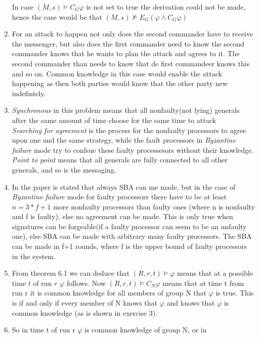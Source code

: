 \documentclass[12pt]{article} %
\begin{document}
\begin{enumerate}
        In case $(M,s) \models C_G\varphi$ is not set to true the derivation
        could not be made, hence the case would be that $(M,s) \nvDash
        E_G(\varphi \wedge C_G\varphi)$
    \item
        For an attack to happen not only does the second commander have to receive the
        messenger, but also does the first commander need to know the second
        commander knows that he wants to plan the attack and agrees to it. The
        second commander than needs to know that de first commandeer knows this
        and so on. Common knowledge in this case would enable the attack
        happening as then both parties would know that the other party new
        indefintely.
    \item \emph{Synchronous} in this problem means that all nonfaulty(not
        lying) generals after the same amount of time choose for the same time
        to attack\\
        \emph{Searching for agreement} is the process for the nonfaulty
        processors to agree upon one and the same strategy, while the fault
        processors in \emph{Byzantine failure} mode try to confsue these faulty
        processesors without their knowledge.\\
        \emph{Point to point} means that all generals are fully connected to all
        other generals, and so is the messaging.
    \item In the paper is stated that always SBA can me made, but in the case of \emph{Byzantine failure}
        mode for faulty processors there have to be at least $n = 3*f + 1$ more
        nonfaulty processors than faulty ones (where n is nonfaulty and f is
        faulty), else no agreement can be made. This is only true when
        signatures can be forgeable(if a faulty processor can seem to be an
        unfaulty one), else SBA can be made with arbitrary many
        faulty processors. The SBA can be made in f+1 rounds, where f is the
        upper bound of faulty processors in the system.
    \item From theorem 6.1 we can deduce that $(R, r, t) \models \varphi$ means
        that at a possible time $t$ of run $r$ $\varphi$ follows. Now
         $(R, r, t) \models  C_N\varphi$ means that at time t from run r it is
         common knowledge for all members of group N that $\varphi$ is true.
         This is if and only if every member of N knows that $\varphi$ and knows
         that $\varphi$ is common knowledge (as is shown in exercise 3).
    \item So in time t of run r $\varphi$ is common knowledge of group N, or in

\end{enumerate}
\end{document}
